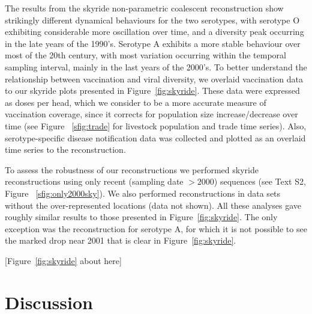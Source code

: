 \documentclass[10pt]{article}
\begin{document}
The results from the skyride non-parametric coalescent reconstruction show strikingly different dynamical behaviours for the two serotypes, with serotype O exhibiting considerable more oscillation over time, and a diversity peak occurring in the late years of the 1990's.
Serotype A exhibits a more stable behaviour over most of the 20th century, with most variation occurring within the temporal sampling interval, mainly in the last years of the 2000's.
To better understand the relationship between vaccination and viral diversity, we overlaid vaccination data to our skyride plots presented in Figure~\ref{fig:skyride}.
These data were expressed as doses per head, which we consider to be a more accurate measure of vaccination coverage, since it corrects for population size increase/decrease over time (see Figure ~\ref{sfig:trade} for livestock population and trade time series). 
Also, serotype-specific disease notification data was collected and plotted as an overlaid time series to the reconstruction. 

To assess the robustness of our reconstructions we performed skyride reconstructions using only recent (sampling date $>2000$) sequences (see Text S2, Figure ~\ref{sfig:only2000sky}).
We also performed reconstructions in data sets without the over-represented locations (data not shown).
All these analyses gave roughly similar results to those presented in Figure~\ref{fig:skyride}.
The only exception was the reconstruction for serotype A, for which it is not possible to see the marked drop near 2001 that is clear in Figure~\ref{fig:skyride}. 

\begin{center}
 [Figure~\ref{fig:skyride} about here]
\end{center}

\section*{Discussion}

\end{document}
